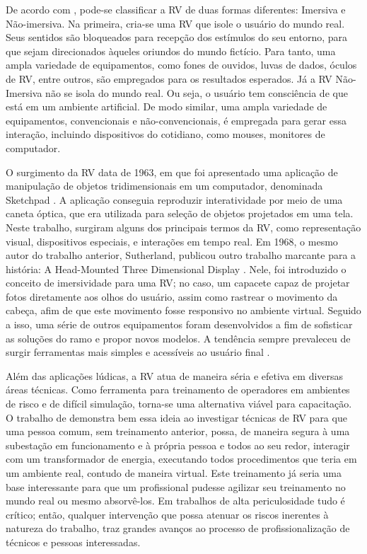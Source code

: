 De acordo com \cite{cardoso2007tecnologias}, pode-se classificar a RV de duas formas diferentes: Imersiva e Não-imersiva. Na primeira, cria-se uma RV que isole o usuário do mundo real. Seus sentidos são bloqueados para recepção dos estímulos do seu entorno, para que sejam direcionados àqueles oriundos do mundo fictício. Para tanto, uma ampla variedade de equipamentos, como fones de ouvidos, luvas de dados, óculos de RV, entre outros, são empregados para os resultados esperados. Já a RV Não-Imersiva não se isola do mundo real. Ou seja, o usuário tem consciência de que está em um ambiente artificial. De modo similar, uma ampla variedade de equipamentos, convencionais e não-convencionais, é empregada para gerar essa interação, incluindo dispositivos do cotidiano, como mouses, monitores de computador.



O surgimento da RV data de 1963, em que foi apresentado uma aplicação de manipulação de objetos tridimensionais em um computador, denominada Sketchpad \cite{sutherland1963sketchpad}. A aplicação conseguia reproduzir interatividade por meio de uma caneta óptica, que era utilizada para seleção de objetos projetados em uma tela. Neste trabalho, surgiram alguns dos principais termos da RV, como representação visual, dispositivos especiais, e interações em tempo real. Em 1968, o mesmo autor do trabalho anterior, Sutherland, publicou outro trabalho marcante para a história: A Head-Mounted Three Dimensional Display \cite{sutherland1968head}. Nele, foi introduzido o conceito de imersividade para uma RV; no caso, um capacete capaz de projetar fotos diretamente aos olhos do usuário, assim como rastrear o movimento da cabeça, afim de que este movimento fosse responsivo no ambiente virtual. Seguido a isso, uma série de outros equipamentos foram desenvolvidos a fim de sofisticar as soluções do ramo e propor novos modelos. A tendência sempre prevaleceu de surgir ferramentas mais simples e acessíveis ao usuário final \cite{kirner2011evoluccao}.

Além das aplicações lúdicas, a RV atua de maneira séria e efetiva em diversas áreas técnicas. Como ferramenta para treinamento de operadores em ambientes de risco e de difícil simulação, torna-se uma alternativa viável para capacitação.  O trabalho de \cite{silva2012virtual} demonstra bem essa ideia ao investigar técnicas de RV para que uma pessoa comum, sem treinamento anterior, possa, de maneira segura à uma subestação em funcionamento e à própria pessoa e todos ao seu redor, interagir com um transformador de energia, executando todos procedimentos que teria em um ambiente real, contudo de maneira virtual. Este treinamento já seria uma base interessante para que um profissional pudesse agilizar seu treinamento no mundo real ou mesmo absorvê-los. Em trabalhos de alta periculosidade tudo é crítico; então, qualquer intervenção que possa atenuar os riscos inerentes à natureza do trabalho, traz grandes avanços ao processo de profissionalização de técnicos e pessoas interessadas. 


